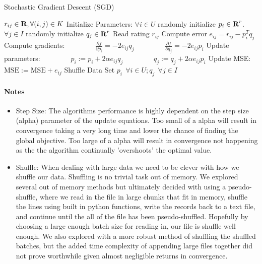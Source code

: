 \documentclass[12pt]{article}
\begin{document}
\begin{algorithm}[H]
\caption{Stochastic Gradient Descent (SGD)}
\begin{algorithmic}
\Require $r_{ij} \in {\mbox{\bf R}},  \forall (i,j)\in K$
\State Initialize Parameters: $\forall i\in U$ randomly initialize $p_i\in {\mbox{\bf R}}^r$. $\forall j\in I$ randomly initialize  $q_j\in {\mbox{\bf R}}^r$
\Repeat
	\State Read rating $r_{ij}$
	\State Compute error $e_{ij} = r_{ij} - p_i^Tq_j$
	\State Compute gradients: 
	\State $\qquad \qquad \frac{\partial f}{\partial p_i} = -2e_{ij}q_j$
	\State $\qquad \qquad \frac{\partial f}{\partial q_j} = -2e_{ij}p_i$
	\State Update parameters:
	\State $\qquad \qquad p_i:=p_i + 2\alpha e_{ij} q_j$
	\State $\qquad \qquad q_j:=q_j + 2\alpha e_{ij} p_i$
	\State Update MSE: $\text{MSE} := \text{MSE} + e_{ij}$
\State Shuffle Data Set
\Ensure $p_i~~\forall i\in U; q_j ~~\forall j\in I$
\end{algorithmic}
\end{algorithm}

\paragraph{Notes}
\begin{itemize}

	\item Step Size: The algorithms performance is highly dependent on the step size (alpha) parameter of the update equations. Too small of a alpha will result in convergence taking a very long time and lower the chance of finding the global objective. Too large of a alpha will result in convergence not happening as the the algorithm continually 'overshoots' the optimal value. 
	
	\item Shuffle: When dealing with large data we need to be clever with how we shuffle our data. Shuffling is no trivial task out of memory. We explored several out of memory methods but ultimately decided with using a pseudo-shuffle, where we read in the file in large chunks that fit in memory, shuffle the lines using built in python functions, write the records back to a text file, and continue until the all of the file has been pseudo-shuffled. Hopefully by choosing a large enough batch size for reading in, our file is shuffle well enough. We also explored with a more robust method of shuffling the shuffled batches, but the added time complexity of appending large files together did not prove worthwhile given almost negligible returns in convergence.

\end{itemize}
\end{document}
